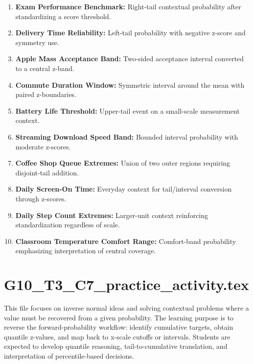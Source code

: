 \begin{enumerate}
  \item \textbf{Exam Performance Benchmark:} Right-tail contextual probability after standardizing a score threshold.
  \item \textbf{Delivery Time Reliability:} Left-tail probability with negative z-score and symmetry use.
  \item \textbf{Apple Mass Acceptance Band:} Two-sided acceptance interval converted to a central z-band.
  \item \textbf{Commute Duration Window:} Symmetric interval around the mean with paired z-boundaries.
  \item \textbf{Battery Life Threshold:} Upper-tail event on a small-scale measurement context.
  \item \textbf{Streaming Download Speed Band:} Bounded interval probability with moderate z-scores.
  \item \textbf{Coffee Shop Queue Extremes:} Union of two outer regions requiring disjoint-tail addition.
  \item \textbf{Daily Screen-On Time:} Everyday context for tail/interval conversion through z-scores.
  \item \textbf{Daily Step Count Extremes:} Larger-unit context reinforcing standardization regardless of scale.
  \item \textbf{Classroom Temperature Comfort Range:} Comfort-band probability emphasizing interpretation of central coverage.
\end{enumerate}

\section{G10\_T3\_C7\_practice\_activity.tex}
This file focuses on inverse normal ideas and solving contextual problems where a value must be recovered from a given probability. The learning purpose is to reverse the forward-probability workflow: identify cumulative targets, obtain quantile z-values, and map back to x-scale cutoffs or intervals. Students are expected to develop quantile reasoning, tail-to-cumulative translation, and interpretation of percentile-based decisions.

